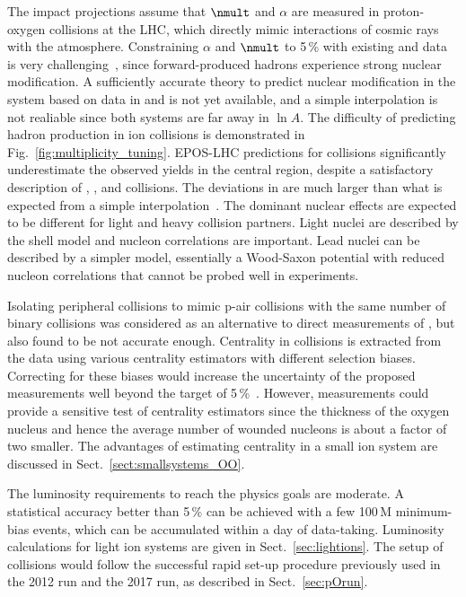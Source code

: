 \documentclass[../report.tex]{subfiles}
\begin{document}
The impact projections assume that $\nmult$ and $\alpha$ are measured in proton-oxygen collisions at the LHC, which directly mimic interactions of cosmic rays with the atmosphere. Constraining $\alpha$ and $\nmult$ to 5\,\% with existing \pp and \pPb data is very challenging~\cite{dEnterria:2018kcz}, since forward-produced hadrons experience strong nuclear modification\cite{Aaij:2017cqq,Acharya:2018qsh,Adriani:2015iwv}. A sufficiently accurate theory to predict nuclear modification in the \pO system based on data in \pp and \pPb is not yet available, and a simple interpolation is not realiable since both systems are far away in $\ln A$.
The difficulty of predicting hadron production in ion collisions is demonstrated in Fig.~\ref{fig:multiplicity_tuning}. EPOS-LHC predictions for \XeXe collisions significantly underestimate the observed yields in the central region, despite a satisfactory description of \pp, \pPb, and \PbPb collisions. The deviations in \XeXe are much larger than what is expected from a simple interpolation~\cite{Kim:2018ink}. The dominant nuclear effects are expected to be different for light and heavy collision partners. Light nuclei are described by the shell model and nucleon correlations are important. Lead nuclei can be described by a simpler model, essentially a Wood-Saxon potential with reduced nucleon correlations that cannot be probed well in experiments.

Isolating peripheral \pPb collisions to mimic p-air collisions with the same number of binary collisions was considered as an alternative to direct measurements of \pO, but also found to be not accurate enough. Centrality in \pPb collisions is extracted from the data using various centrality estimators with different selection biases. Correcting for these biases would increase the uncertainty of the proposed measurements well beyond the target of 5\,\%~\cite{Toia:2014wia}. However, \pO measurements could provide a sensitive test of centrality estimators since the thickness of the oxygen nucleus and hence the average number of wounded nucleons is about a factor of two smaller. The advantages of estimating centrality in a small ion system are discussed in Sect.~\ref{sect:smallsystems_OO}.

The luminosity requirements to reach the physics goals are moderate. A statistical accuracy better than 5\,\% can be achieved with a few 100\,M minimum-bias events, which can be accumulated within a day of data-taking. Luminosity calculations for light ion systems are given in Sect.\ \ref{sec:lightions}. The setup of \pO collisions would follow the successful rapid set-up procedure previously used in the 2012 \pPb run and the 2017 \XeXe run, as described in Sect.~\ref{sec:pOrun}.
\end{document}
